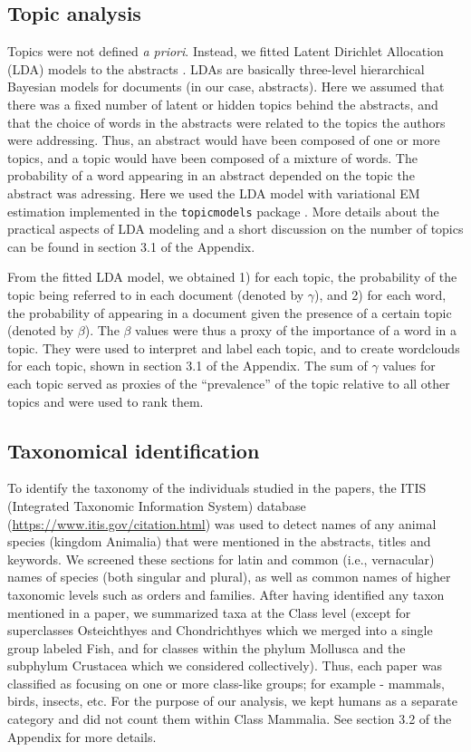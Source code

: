 \documentclass[a4paper,12pt]{article}
\begin{document}
\subsection*{Topic analysis}

Topics were not defined \emph{a priori}. Instead, we fitted Latent
Dirichlet Allocation (LDA) models to the abstracts \cite{Blei2003}. LDAs are
basically three-level hierarchical Bayesian models for documents (in our
case, abstracts). Here we assumed that there was a fixed number of
latent or hidden topics behind the abstracts, and that the choice of
words in the abstracts were related to the topics the authors were
addressing. Thus, an abstract would have been composed of one or more
topics, and a topic would have been composed of a mixture of words. The
probability of a word appearing in an abstract depended on the topic the
abstract was adressing. Here we used the LDA model with variational EM
estimation \cite{Wainwright2008} implemented in the \texttt{topicmodels} package \cite{Grun2011}.
More details about the practical aspects of LDA modeling and a short
discussion on the number of topics can be found in section 3.1 of the
Appendix.

From the fitted LDA model, we obtained 1) for each topic, the
probability of the topic being referred to in each document (denoted by
\(\gamma\)), and 2) for each word, the probability of appearing in a
document given the presence of a certain topic (denoted by \(\beta\)).
The \(\beta\) values were thus a proxy of the importance of a word in a
topic. They were used to interpret and label each topic, and to create
wordclouds for each topic, shown in section 3.1 of the Appendix. The sum
of \(\gamma\) values for each topic served as proxies of the
``prevalence'' of the topic relative to all other topics and were used
to rank them.


\subsection*{Taxonomical identification}

To identify the taxonomy of the individuals studied in the papers, the
ITIS (Integrated Taxonomic Information System) database
(\url{https://www.itis.gov/citation.html}) was used to detect names of
any animal species (kingdom Animalia) that were mentioned in the
abstracts, titles and keywords. We screened these sections for latin and
common (i.e., vernacular) names of species (both singular and plural),
as well as common names of higher taxonomic levels such as orders and
families. After having identified any taxon mentioned in a paper, we
summarized taxa at the Class level (except for superclasses Osteichthyes
and Chondrichthyes which we merged into a single group labeled Fish, and
for classes within the phylum Mollusca and the subphylum Crustacea which
we considered collectively). Thus, each paper was classified as focusing
on one or more class-like groups; for example - mammals, birds, insects,
etc. For the purpose of our analysis, we kept humans as a separate
category and did not count them within Class Mammalia. See section 3.2
of the Appendix for more details.
\end{document}
